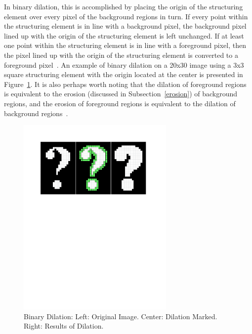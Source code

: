 \documentclass{sig-alternate}
\begin{document}
In binary dilation, this is accomplished by placing the origin of the structuring element over every pixel of the background regions in turn. If every point within the structuring element is in line with a background pixel, the background pixel lined up with the origin of the structuring element is left unchanged. If at least one point within the structuring element is in line with a foreground pixel, then the pixel lined up with the origin of the structuring element is converted to a foreground pixel~\cite{MorphologyWiki}. An example of binary dilation on a 20x30 image using a 3x3 square structuring element with the origin located at the center is presented in Figure~\ref{binary dilation figure}. It is also perhaps worth noting that the dilation of foreground regions is equivalent to the erosion (discussed in Subsection~\ref{erosion}) of background regions, and the erosion of foreground regions is equivalent to the dilation of background regions~\cite{MorphologyWiki}.
\begin{figure}
\centering
\includegraphics[width=3in,trim={0 6.75in 0 0},clip]{dilation}
\caption{Binary Dilation: Left: Original Image. Center: Dilation Marked. Right: Results of Dilation.}
\label{binary dilation figure}
\end{figure}
\end{document}
